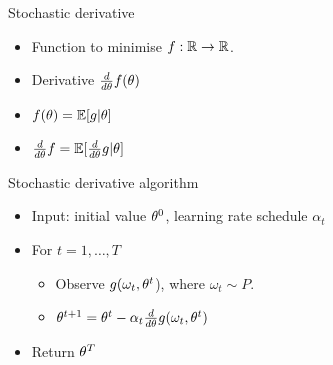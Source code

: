 \documentclass[smaller]{beamer}
\begin{document}
\begin{frame}[label={sec:orgd8c81ad}]{Stochastic derivative}
\begin{itemize}
\item Function to minimise \(f : \mathbb{R} \to \mathbb{R}\).
\item Derivative \(\frac{d}{d \theta} f(\theta)\)
\item \(f(\theta) = \mathop{\mbox{\ensuremath{\mathbb{E}}}}\nolimits[g | \theta]\)
\item \(\frac{d}{d \theta} f = \mathop{\mbox{\ensuremath{\mathbb{E}}}}\nolimits[ \frac{d}{d \theta} g | \theta]\)
\end{itemize}
\pause
\begin{block}{Stochastic derivative algorithm}
\begin{itemize}
\item Input: initial value \(\theta^0\), \alert{learning rate} schedule \(\alpha_t\)
\item For \(t=1, \ldots, T\)
\begin{itemize}
\item Observe \(g(\omega_t, \theta^t\)), where \(\omega_t \sim P\).
\item \(\theta^{t+1} = \theta^t - \alpha_t \frac{d}{d \theta} g(\omega_t, \theta^t)\)
\end{itemize}
\item Return \(\theta^T\)
\end{itemize}
\end{block}
\end{frame}
\end{document}
